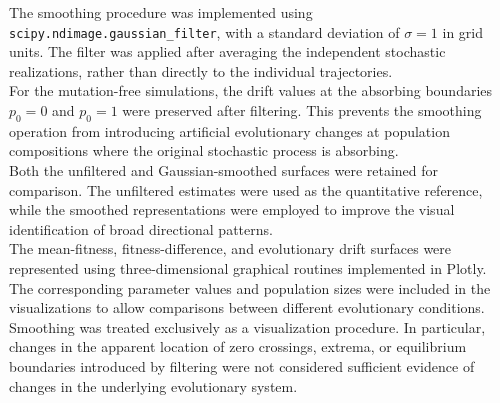 The smoothing procedure was implemented using \texttt{scipy.ndimage.gaussian\_filter}, with a standard deviation of \(\sigma=1\) in grid units. The filter was applied after averaging the independent stochastic realizations, rather than directly to the individual trajectories. \\ 

For the mutation-free simulations, the drift values at the absorbing boundaries \(p_0=0\) and \(p_0=1\) were preserved after filtering. This prevents the smoothing operation from introducing artificial evolutionary changes at population compositions where the original stochastic process is absorbing. \\ 

Both the unfiltered and Gaussian-smoothed surfaces were retained for comparison. The unfiltered estimates were used as the quantitative reference, while the smoothed representations were employed to improve the visual identification of broad directional patterns. \\ 

The mean-fitness, fitness-difference, and evolutionary drift surfaces were represented using three-dimensional graphical routines implemented in Plotly. The corresponding parameter values and population sizes were included in the visualizations to allow comparisons between different evolutionary conditions. \\ 

Smoothing was treated exclusively as a visualization procedure. In particular, changes in the apparent location of zero crossings, extrema, or equilibrium boundaries introduced by filtering were not considered sufficient evidence of changes in the underlying evolutionary system. \\ 